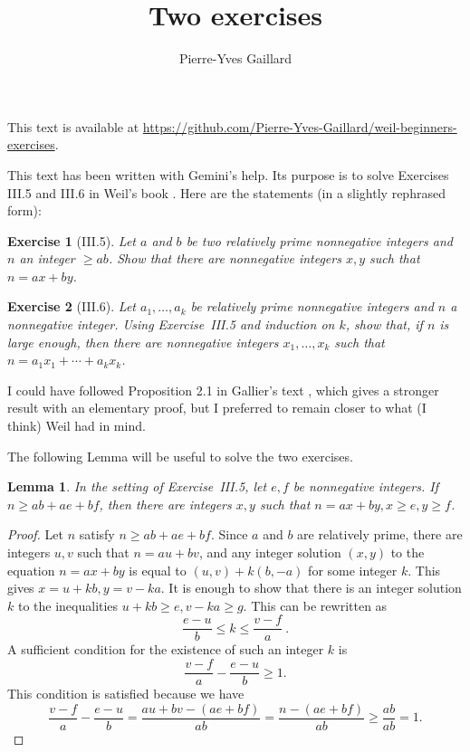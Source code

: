 \documentclass[12pt,letterpaper]{article}
\title{Two exercises} \author{Pierre-Yves Gaillard} \date{}
\newtheorem*{exo}{Exercise}
\newtheorem*{lem}{Lemma}
\begin{document}

\maketitle %
\begin{center}
{\scriptsize This text is available at \url{https://github.com/Pierre-Yves-Gaillard/weil-beginners-exercises}.}
\end{center}

This text has been written with Gemini's help. Its purpose is to solve Exercises III.5 and III.6 in Weil's book \cite{weil1979}. Here are the statements (in a slightly rephrased form): 

\begin{exo}[III.5] 
Let $a$ and $b$ be two relatively prime nonnegative integers and $n$ an integer $\ge ab$. Show that there are nonnegative integers $x,y$ such that $n=ax+by$. 
\end{exo} 

\begin{exo}[III.6] 
Let $a_1,\ldots,a_k$ be relatively prime nonnegative integers and $n$ a nonnegative integer. Using Exercise~III.5 and induction on $k$, show that, if $n$ is large enough, then there are nonnegative integers $x_1,\ldots,x_k$ such that $n=a_1x_1+\cdots+a_kx_k$. 
\end{exo} 

I could have followed Proposition 2.1 in Gallier's text \cite{gallier}, which gives a stronger result with an elementary proof, but I preferred to remain closer to what (I think) Weil had in mind. 

The following Lemma will be useful to solve the two exercises. 

\begin{lem}
In the setting of Exercise~III.5, let $e,f$ be nonnegative integers. If $n\ge ab+ae+bf$, then there are integers $x,y$ such that $n=ax+by,x\ge e,y\ge f$. 
\end{lem}

\begin{proof} 
Let $n$ satisfy $n\ge ab+ae+bf$. Since $a$ and $b$ are relatively prime, there are integers $u,v$ such that $n=au+bv$, and any integer solution $(x,y)$ to the equation $n=ax+by$ is equal to $(u,v)+k(b,-a)$ for some integer $k$. This gives $x=u+kb,y=v-ka$. It is enough to show that there is an integer solution $k$ to the inequalities $u+kb\ge e,v-ka\ge g$. This can be rewritten as 
$$
\frac{e-u}b\le k\le\frac{v-f}a\ .
$$ 
A sufficient condition for the existence of such an integer $k$ is 
$$
\frac{v-f}a-\frac{e-u}b\ge1.
$$ 
This condition is satisfied because we have 
$$
\frac{v-f}a-\frac{e-u}b=\frac{au+bv-(ae+bf)}{ab}=\frac{n-(ae+bf)}{ab}\ge\frac{ab}{ab}=1.
$$ 
\end{proof} 
\end{document}
